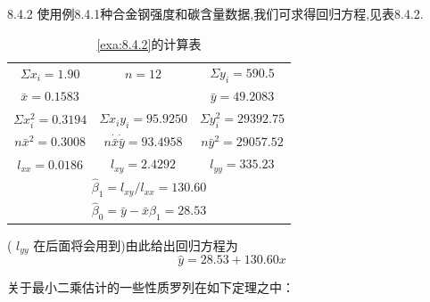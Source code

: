 \begin{example}{8.4.2}
	使用例8.4.1种合金钢强度和碳含量数据,我们可求得回归方程,见表8.4.2.
	\begin{table}[htbp]
		\centering
		\caption{\ref{exa:8.4.2}的计算表}
		\begin{tabular}{ccc}
			\toprule
			$ \Sigma x_i=1.90  $ 	&    \( n=12 \)    &  $ \Sigma y_i=590.5  $  \\
			$ \bar{x}=0.1583  $ 	&       &  $ \bar{y}=49.2083  $  \\
			$ \Sigma x_{i}^{2}=0.3194$ 	&   $ \Sigma x_iy_i=95.9250  $      &  $ \Sigma y_i^2=29392.75  $  \\
			$ n\bar{x}^2=0.3008  $ 	&   $ n\dot \bar{x}\dot\bar{y}=93.4958  $      &  $ n\bar{y}^2=29057.52  $  \\
			$ l_{xx}=0.0186  $ 	&    $ l_{xy}=2.4292 $   &  $ l_{yy}=335.23  $\\
			\multicolumn{3}{c}{ $ \hat{\beta}_1=l_{xy}^{}/l_{xx}^{}=130.60  $ } \\
			\multicolumn{3}{c}{ $ \hat{\beta}_0=\bar{y}-\bar{x}\hat{\beta}_1=28.53  $ } \\
		\end{tabular}%
		\label{tab:8.4.2}%
	\end{table}%
	( $ l_{yy}^{}  $ 在后面将会用到)由此给出回归方程为
	\[
	\hat{y}=28.53+130.60x 
	\]
\end{example}
关于最小二乘估计的一些性质罗列在如下定理之中：

